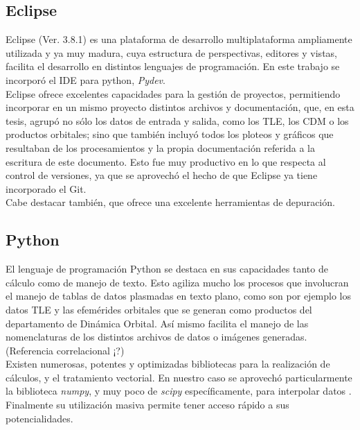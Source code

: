 \subsection*{Eclipse}
Eclipse (Ver. 3.8.1) es una plataforma de desarrollo multiplataforma ampliamente utilizada y ya muy madura, cuya estructura de perspectivas, editores y vistas, facilita el desarrollo en distintos lenguajes de programaci\'on. En este trabajo se incorpor\'o el IDE para python, {\it{Pydev}}.\\
Eclipse ofrece excelentes capacidades para la gesti\'on de proyectos, permitiendo incorporar en un mismo proyecto distintos archivos y documentaci\'on, que, en esta tesis, agrup\'o no s\'olo los datos de entrada y salida, como los TLE, los CDM o los productos orbitales; sino que tambi\'en incluy\'o todos los ploteos y gr\'aficos que resultaban de los procesamientos y la propia documentaci\'on referida a la escritura de este documento. Esto fue muy productivo en lo que respecta al control de versiones, ya que se aprovech\'o el hecho de que Eclipse ya tiene incorporado el Git.\\
Cabe destacar también, que ofrece una excelente herramientas de depuraci\'on.\\

\subsection*{Python}
El lenguaje de programaci\'on Python se destaca en sus capacidades tanto de c\'alculo como de manejo de texto. Esto agiliza mucho los procesos que involucran el manejo de tablas de datos plasmadas en texto plano, como son por ejemplo los datos TLE y las efem\'erides orbitales que se generan como productos del departamento de Din\'amica Orbital. As\'i mismo facilita el manejo de las nomenclaturas de los distintos archivos de datos o im\'agenes generadas. (Referencia correlacional ¡?)\\
Existen numerosas, potentes y optimizadas bibliotecas para la realizaci\'on de c\'alculos, y el tratamiento vectorial. En nuestro caso se aprovech\'o particularmente la biblioteca {\it{numpy}}, y muy poco de {\it{scipy}} espec\'ificamente, para interpolar datos .\\
Finalmente su utilizaci\'on masiva permite tener acceso r\'apido a sus potencialidades.\\

